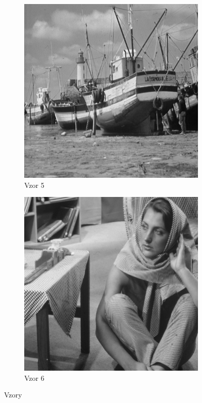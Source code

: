 \documentclass[a4paper,11pt,titlepage]{scrartcl}
\begin{document}
\begin{figure}[!h]
\begin{subfigure}[b]{0.4\textwidth}
    \end{subfigure}
    \begin{subfigure}[b]{0.4\textwidth}
        \includegraphics[width=\textwidth]{img/example5.png}
        \caption{Vzor 5}
        \label{fig:gull}
    \end{subfigure}
    \begin{subfigure}[b]{0.4\textwidth}
        \includegraphics[width=\textwidth]{img/example6.png}
        \caption{Vzor 6}
        \label{fig:gull}
    \end{subfigure}
    \caption{Vzory}
    \label{vzory}    
\end{figure}
\end{document}
